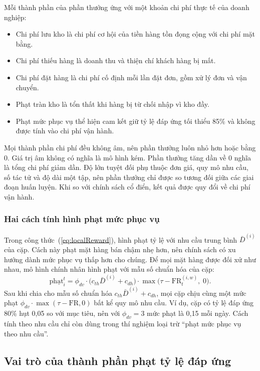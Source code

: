 Mỗi thành phần của phần thưởng ứng với một khoản chi phí thực tế của doanh nghiệp:
\begin{itemize}
    \item Chi phí lưu kho là chi phí cơ hội của tiền hàng tồn đọng cộng với chi phí mặt bằng.
    \item Chi phí thiếu hàng là doanh thu và thiện chí khách hàng bị mất.
    \item Chi phí đặt hàng là chi phí cố định mỗi lần đặt đơn, gồm xử lý đơn và vận chuyển.
    \item Phạt tràn kho là tổn thất khi hàng bị từ chối nhập vì kho đầy.
    \item Phạt mức phục vụ thể hiện cam kết giữ tỷ lệ đáp ứng tối thiểu 85\% và không được tính vào chi phí vận hành.
\end{itemize}

Mọi thành phần chi phí đều không âm, nên phần thưởng luôn nhỏ hơn hoặc bằng 0. Giá trị âm không có nghĩa là mô hình kém. Phần thưởng tăng dần về 0 nghĩa là tổng chi phí giảm dần. Độ lớn tuyệt đối phụ thuộc đơn giá, quy mô nhu cầu, số tác tử và độ dài một tập, nên phần thưởng chỉ được so tương đối giữa các giai đoạn huấn luyện. Khi so với chính sách cổ điển, kết quả được quy đổi về chi phí vận hành.

\subsubsection{Hai cách tính hình phạt mức phục vụ}

Trong công thức~(\ref{eq:localReward}), hình phạt tỷ lệ với nhu cầu trung bình $\bar{D}^{(i)}$ của cặp. Cách này phạt mặt hàng bán chậm nhẹ hơn, nên chính sách có xu hướng dành mức phục vụ thấp hơn cho chúng. Để mọi mặt hàng được đối xử như nhau, mô hình chính nhân hình phạt với mẫu số chuẩn hóa của cặp:
\begin{equation}
    \text{phạt}_i^t = \phi_{dv} \cdot \bigl(c_{th} \bar{D}^{(i)} + c_{dh}\bigr)
    \cdot \max\bigl(\tau - \text{FR}_t^{(i, w)},\; 0\bigr).
    \label{eq:phatChuanHoa}
\end{equation}
Sau khi chia cho mẫu số chuẩn hóa $c_{th}\bar{D}^{(i)} + c_{dh}$, mọi cặp chịu cùng một mức phạt $\phi_{dv} \cdot \max(\tau - \text{FR}, 0)$ bất kể quy mô nhu cầu. Ví dụ, cặp có tỷ lệ đáp ứng 80\% hụt 0,05 so với mục tiêu, nên với $\phi_{dv} = 3$ mức phạt là 0,15 mỗi ngày. Cách tính theo nhu cầu chỉ còn dùng trong thí nghiệm loại trừ ``phạt mức phục vụ theo nhu cầu''.

\subsection{Vai trò của thành phần phạt tỷ lệ đáp ứng}
\label{subsec:fillRate}

